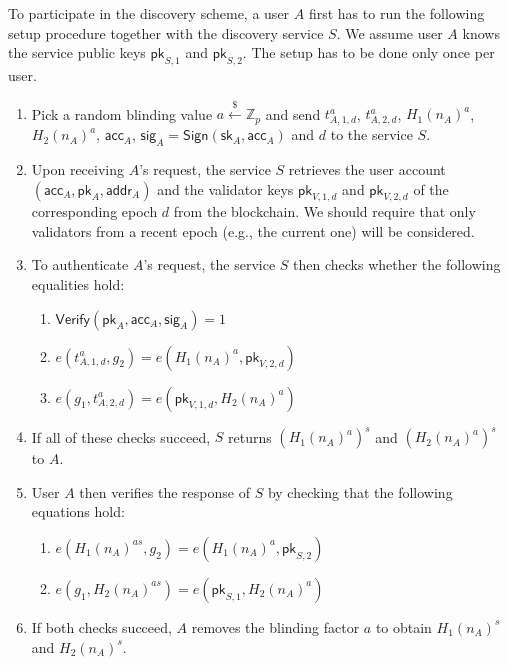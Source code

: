 \documentclass[11pt,letterpaper]{article}
\theoremstyle{definition}
\newcommand{\ZZ}{\mathbb{Z}}
\newcommand{\pk}{\mathsf{pk}}
\newcommand{\sk}{\mathsf{sk}}
\newcommand{\acc}{\mathsf{acc}}
\newcommand{\sig}{\mathsf{sig}}
\newcommand{\addr}{\mathsf{addr}}
\newcommand{\pick}{\xleftarrow{\scriptscriptstyle \$}}
\newcommand{\sign}{\mathsf{Sign}}
\newcommand{\verify}{\mathsf{Verify}}
\begin{document}
To participate in the discovery scheme, a user $A$ first has to run the
following setup procedure together with the discovery service $S$. We assume
user $A$ knows the service public keys $\pk_{S,1}$ and $\pk_{S,2}$. The setup
has to be done only once per user.

\begin{enumerate}

  \item Pick a random blinding value $a \pick \ZZ_p$ and send $t_{A,1,d}^{a}$,
        $t_{A,2,d}^{a}$, $H_1(n_A)^{a}$, $H_2(n_A)^{a}$, $\acc_A$, $\sig_A =
          \sign(\sk_A, \acc_A)$ and $d$ to the service $S$.

  \item Upon receiving $A$'s request, the service $S$ retrieves the user
        account $(\acc_A, \pk_A, \addr_A)$ and the validator keys $\pk_{V,1,d}$ and
        $\pk_{V,2,d}$ of the corresponding epoch $d$ from the blockchain. We should require that only validators from a recent epoch (e.g., the current one) will be considered.

  \item To authenticate $A$'s request, the service $S$ then checks whether the
        following equalities hold:

        \begin{enumerate}

          \item $\verify(\pk_A, \acc_A, \sig_A) = 1$

          \item $e(t_{A,1,d}^{a}, g_2) = e(H_1(n_A)^{a}, \pk_{V,2,d})$

          \item $e(g_1, t_{A,2,d}^{a}) = e(\pk_{V,1,d}, H_2(n_A)^{a})$

        \end{enumerate}

  \item If all of these checks succeed, $S$ returns $(H_1(n_A)^{a})^s$ and
        $(H_2(n_A)^{a})^s$ to $A$.

  \item User $A$ then verifies the response of $S$ by checking that the
        following equations hold:

        \begin{enumerate}

          \item $e(H_1(n_A)^{as}, g_2) = e(H_1(n_A)^{a}, \pk_{S,2})$

          \item $e(g_1, H_2(n_A)^{as}) = e(\pk_{S,1}, H_2(n_A)^{a})$

        \end{enumerate}

  \item If both checks succeed, $A$ removes the blinding factor $a$ to obtain
        $H_1(n_A)^{s}$ and $H_2(n_A)^{s}$.

\end{enumerate}
\end{document}
